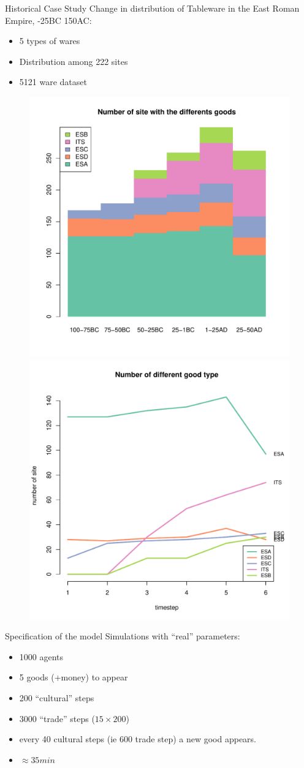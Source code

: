 \documentclass[12pt, notes=show]{beamer}
\begin{document}
\begin{frame}{Historical Case Study}
    \footnotesize
    \vspace{.5cm}
Change in distribution of Tableware in the East Roman Empire, -25BC 150AC:
    \begin{itemize}
	\item 5 types of wares 
	\item Distribution among 222 sites
	\item 5121 ware dataset
 \end{itemize}

 \begin{figure}
     \includegraphics[width=.45\textwidth]{../images/hmNbSiteWGoodData.pdf}
     \includegraphics[width=.45\textwidth]{../images/plotNbSiteWGoodData.pdf}
     
 \end{figure}
\end{frame}

\begin{frame}{Specification of the model}
    Simulations with ``real'' parameters:
    \begin{itemize}
	\item 1000 agents
	\item 5 goods (+money) to appear 
	\item 200 ``cultural'' steps 
	\item 3000 ``trade'' steps ($15\times200$)
	\item every 40 cultural steps (ie $600$ trade step) a new good appears.
	\item $\approx 35min$
    \end{itemize}
\end{frame}
\end{document}
